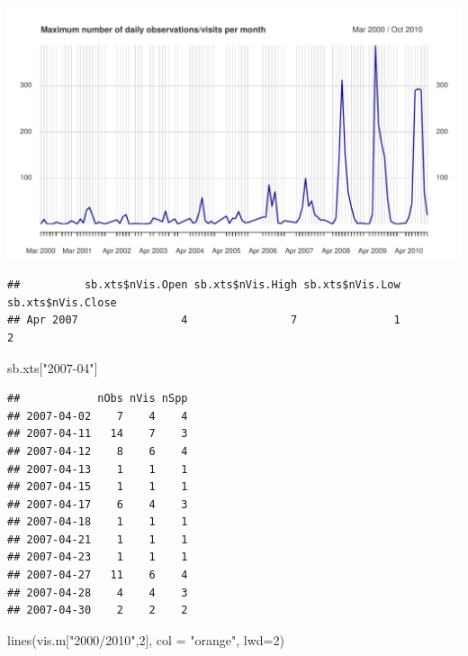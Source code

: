 \documentclass[
  10pt,
]{article}
\newenvironment{Shaded}{\begin{snugshade}}{\end{snugshade}}
\newcommand{\AttributeTok}[1]{\textcolor[rgb]{0.77,0.63,0.00}{#1}}
\newcommand{\DecValTok}[1]{\textcolor[rgb]{0.00,0.00,0.81}{#1}}
\newcommand{\FunctionTok}[1]{\textcolor[rgb]{0.00,0.00,0.00}{#1}}
\newcommand{\NormalTok}[1]{#1}
\newcommand{\OtherTok}[1]{\textcolor[rgb]{0.56,0.35,0.01}{#1}}
\newcommand{\SpecialCharTok}[1]{\textcolor[rgb]{0.00,0.00,0.00}{#1}}
\newcommand{\StringTok}[1]{\textcolor[rgb]{0.31,0.60,0.02}{#1}}
\begin{document}
\includegraphics{r-tools-tutorial_files/figure-latex/monthly and plot-1.pdf}

\begin{Shaded}
\end{Shaded}

\begin{verbatim}
##          sb.xts$nVis.Open sb.xts$nVis.High sb.xts$nVis.Low sb.xts$nVis.Close
## Apr 2007                4                7               1                 2
\end{verbatim}

\begin{Shaded}
\begin{Highlighting}[]
\NormalTok{sb.xts[}\StringTok{"2007{-}04"}\NormalTok{]}
\end{Highlighting}
\end{Shaded}

\begin{verbatim}
##            nObs nVis nSpp
## 2007-04-02    7    4    4
## 2007-04-11   14    7    3
## 2007-04-12    8    6    4
## 2007-04-13    1    1    1
## 2007-04-15    1    1    1
## 2007-04-17    6    4    3
## 2007-04-18    1    1    1
## 2007-04-21    1    1    1
## 2007-04-23    1    1    1
## 2007-04-27   11    6    4
## 2007-04-28    4    4    3
## 2007-04-30    2    2    2
\end{verbatim}

\begin{Shaded}
\begin{Highlighting}[]
\FunctionTok{lines}\NormalTok{(vis.m[}\StringTok{"2000/2010"}\NormalTok{,}\DecValTok{2}\NormalTok{], }\AttributeTok{col =} \StringTok{"orange"}\NormalTok{, }\AttributeTok{lwd=}\DecValTok{2}\NormalTok{)}
\end{Highlighting}
\end{Shaded}
\end{document}

